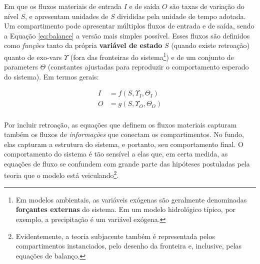 \documentclass[./main.tex]{subfiles}
\begin{document}
Em que os fluxos materiais de entrada $I$ e de saída $O$ são taxas de variação do nível $S$, e apresentam unidades de $S$ divididas pela unidade de tempo adotada. Um compartimento pode apresentar múltiplos fluxos de entrada e de saída, sendo a Equação \eqref{eq:balance} a versão mais simples possível. Esses fluxos são definidos como \textit{funções} tanto da própria \textbf{variável de estado} $S$ (quando existe retroação) quanto de \gls{exo-vars} $\Upsilon$ (fora das fronteiras do sistema\footnote{Em modelos ambientais, as variáveis exógenas são geralmente denominadas \textbf{forçantes externas} do sistema. Em um modelo hidrológico típico, por exemplo, a precipitação é um variável exógena.}) e de um conjunto de \gls{parameters} $\Theta$ (constantes ajustadas para reproduzir o comportamento esperado do sistema). Em termos gerais:
\begin{linenomath*}
\begin{equation}
\label{eq:flows}
\begin{split}
    I &= f(S, \Upsilon_{I}, \Theta_{I})\\
    O &= g(S, \Upsilon_{O}, \Theta_{O})\\
\end{split}
\end{equation}
\end{linenomath*}
Por incluir retroação, as equações que definem os fluxos materiais capturam também os fluxos de \textit{informações} que conectam os compartimentos. No fundo, elas capturam a estrutura do sistema, e portanto, seu comportamento final. O comportamento do sistema é tão sensível a elas que, em certa medida, as equações de fluxo se confundem com grande parte das hipóteses postuladas pela teoria que o modelo está veiculando\footnote{Evidentemente, a teoria subjacente também é representada pelos compartimentos instanciados, pelo desenho da fronteira e, inclusive, pelas equações de balanço.}. 
\end{document}
